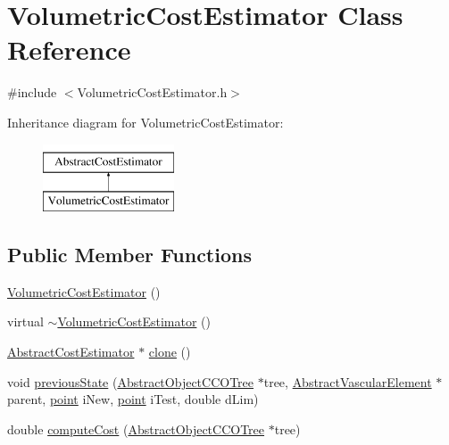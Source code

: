 \hypertarget{class_volumetric_cost_estimator}{}\section{Volumetric\+Cost\+Estimator Class Reference}
\label{class_volumetric_cost_estimator}


{\ttfamily \#include $<$Volumetric\+Cost\+Estimator.\+h$>$}

Inheritance diagram for Volumetric\+Cost\+Estimator\+:\begin{figure}[H]
\begin{center}
\leavevmode
\includegraphics[height=2.000000cm]{d9/d3b/class_volumetric_cost_estimator}
\end{center}
\end{figure}
\subsection*{Public Member Functions}
\begin{DoxyCompactItemize}
\item 
\hyperlink{class_volumetric_cost_estimator_a1d3943123036c047a546bf9f8c55535a}{Volumetric\+Cost\+Estimator} ()
\item 
virtual \hyperlink{class_volumetric_cost_estimator_a5ef83e9f4192bc4e358dfdb61fd4418e}{$\sim$\+Volumetric\+Cost\+Estimator} ()
\item 
\hyperlink{class_abstract_cost_estimator}{Abstract\+Cost\+Estimator} $\ast$ \hyperlink{class_volumetric_cost_estimator_a513b5fa164962f2761485aebf44072bf}{clone} ()
\item 
void \hyperlink{class_volumetric_cost_estimator_a0ff762e6a26e1c6937cc28e88d1dc24d}{previous\+State} (\hyperlink{class_abstract_object_c_c_o_tree}{Abstract\+Object\+C\+C\+O\+Tree} $\ast$tree, \hyperlink{class_abstract_vascular_element}{Abstract\+Vascular\+Element} $\ast$parent, \hyperlink{structpoint}{point} i\+New, \hyperlink{structpoint}{point} i\+Test, double d\+Lim)
\item 
double \hyperlink{class_volumetric_cost_estimator_aca3637b77cc6657e4c5f916f09fd38e3}{compute\+Cost} (\hyperlink{class_abstract_object_c_c_o_tree}{Abstract\+Object\+C\+C\+O\+Tree} $\ast$tree)
\end{DoxyCompactItemize}
